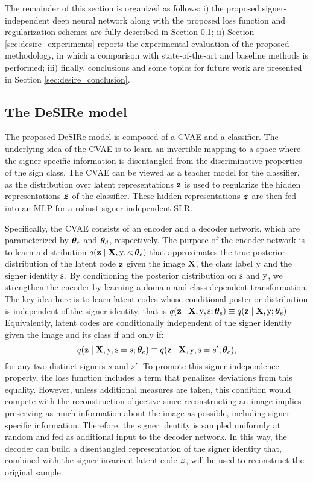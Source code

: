 The remainder of this section is organized as follows: i) the proposed signer-independent deep neural network along with the proposed loss function and regularization schemes are fully described in Section \ref{sec:desire_method}; ii) Section \ref{sec:desire_experiments} reports the experimental evaluation of the proposed methodology, in which a comparison with state-of-the-art and baseline methods is performed; iii) finally, conclusions and some topics for future work are presented in Section \ref{sec:desire_conclusion}.

\subsection{The DeSIRe model}
\label{sec:desire_method}
The proposed DeSIRe model is composed of a CVAE and a classifier. The underlying idea of the CVAE is to learn an invertible mapping to a space where the signer-specific information is disentangled from the discriminative properties of the sign class. The CVAE can be viewed as a teacher model for the classifier, as the distribution over latent representations ${\mathbf{z}}$ is used to regularize the hidden representations $\tilde{{\bm{z}}}$ of the classifier. These hidden representations $\tilde{{\bm{z}}}$ are then fed into an MLP for a robust signer-independent SLR.

Specifically, the CVAE consists of an encoder and a decoder network, which are parameterized by ${\bm{\theta}}_e$ and ${\bm{\theta}}_d$, respectively. The purpose of the encoder network is to learn a distribution $q({\mathbf{z}} \mid {\mathbf{X}}, {\textnormal{y}}, {\textnormal{s}}; {\bm{\theta}}_e)$ that approximates the true posterior distribution of the latent code ${\mathbf{z}}$ given the image ${\mathbf{X}}$, the class label ${\textnormal{y}}$ and the signer identity ${\textnormal{s}}$. By conditioning the posterior distribution on ${\textnormal{s}}$ and ${\textnormal{y}}$, we strengthen the encoder by learning a domain and class-dependent transformation. The key idea here is to learn latent codes whose conditional posterior distribution is independent of the signer identity, that is $q({\mathbf{z}} \mid {\mathbf{X}}, {\textnormal{y}}, {\textnormal{s}}; {\bm{\theta}}_e) \equiv q({\mathbf{z}} \mid {\mathbf{X}}, {\textnormal{y}}; {\bm{\theta}}_e)$. Equivalently, latent codes are conditionally independent of the signer identity given the image and its class if and only if:
\begin{equation}
    \label{eq:independence}
    q({\mathbf{z}} \mid {\mathbf{X}}, {\textnormal{y}}, {\textnormal{s}}=s; {\bm{\theta}}_e) \equiv q({\mathbf{z}} \mid {\mathbf{X}}, {\textnormal{y}}, {\textnormal{s}}=s'; {\bm{\theta}}_e),
\end{equation}
for any two distinct signers $s$ and $s'$. To promote this signer-independence property, the loss function includes a term that penalizes deviations from this equality. However, unless additional measures are taken, this condition would compete with the reconstruction objective since reconstructing an image implies preserving as much information about the image as possible, including signer-specific information. Therefore, the signer identity is sampled uniformly at random and fed as additional input to the decoder network. In this way, the decoder can build a disentangled representation of the signer identity that, combined with the signer-invariant latent code ${\bm{z}}$, will be used to reconstruct the original sample.

